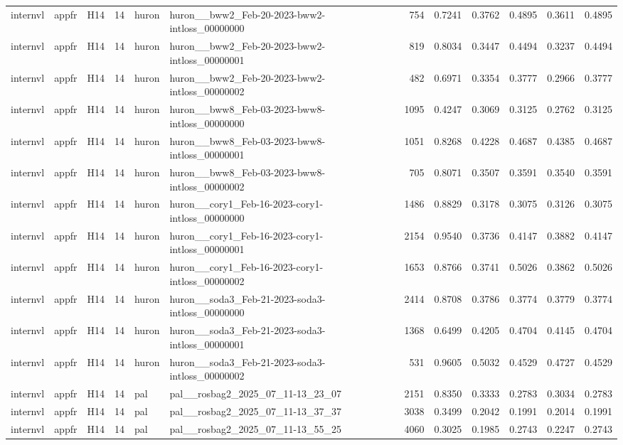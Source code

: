 \begin{table}[tbp]
\begin{tabular}{lllrllrrrrrr}
internvl & appfr & H14 & 14 & huron & huron\_\_bww2\_Feb-20-2023-bww2-intloss\_00000000 & 754 & 0.7241 & 0.3762 & 0.4895 & 0.3611 & 0.4895 \\
internvl & appfr & H14 & 14 & huron & huron\_\_bww2\_Feb-20-2023-bww2-intloss\_00000001 & 819 & 0.8034 & 0.3447 & 0.4494 & 0.3237 & 0.4494 \\
internvl & appfr & H14 & 14 & huron & huron\_\_bww2\_Feb-20-2023-bww2-intloss\_00000002 & 482 & 0.6971 & 0.3354 & 0.3777 & 0.2966 & 0.3777 \\
internvl & appfr & H14 & 14 & huron & huron\_\_bww8\_Feb-03-2023-bww8-intloss\_00000000 & 1095 & 0.4247 & 0.3069 & 0.3125 & 0.2762 & 0.3125 \\
internvl & appfr & H14 & 14 & huron & huron\_\_bww8\_Feb-03-2023-bww8-intloss\_00000001 & 1051 & 0.8268 & 0.4228 & 0.4687 & 0.4385 & 0.4687 \\
internvl & appfr & H14 & 14 & huron & huron\_\_bww8\_Feb-03-2023-bww8-intloss\_00000002 & 705 & 0.8071 & 0.3507 & 0.3591 & 0.3540 & 0.3591 \\
internvl & appfr & H14 & 14 & huron & huron\_\_cory1\_Feb-16-2023-cory1-intloss\_00000000 & 1486 & 0.8829 & 0.3178 & 0.3075 & 0.3126 & 0.3075 \\
internvl & appfr & H14 & 14 & huron & huron\_\_cory1\_Feb-16-2023-cory1-intloss\_00000001 & 2154 & 0.9540 & 0.3736 & 0.4147 & 0.3882 & 0.4147 \\
internvl & appfr & H14 & 14 & huron & huron\_\_cory1\_Feb-16-2023-cory1-intloss\_00000002 & 1653 & 0.8766 & 0.3741 & 0.5026 & 0.3862 & 0.5026 \\
internvl & appfr & H14 & 14 & huron & huron\_\_soda3\_Feb-21-2023-soda3-intloss\_00000000 & 2414 & 0.8708 & 0.3786 & 0.3774 & 0.3779 & 0.3774 \\
internvl & appfr & H14 & 14 & huron & huron\_\_soda3\_Feb-21-2023-soda3-intloss\_00000001 & 1368 & 0.6499 & 0.4205 & 0.4704 & 0.4145 & 0.4704 \\
internvl & appfr & H14 & 14 & huron & huron\_\_soda3\_Feb-21-2023-soda3-intloss\_00000002 & 531 & 0.9605 & 0.5032 & 0.4529 & 0.4727 & 0.4529 \\
internvl & appfr & H14 & 14 & pal & pal\_\_rosbag2\_2025\_07\_11-13\_23\_07 & 2151 & 0.8350 & 0.3333 & 0.2783 & 0.3034 & 0.2783 \\
internvl & appfr & H14 & 14 & pal & pal\_\_rosbag2\_2025\_07\_11-13\_37\_37 & 3038 & 0.3499 & 0.2042 & 0.1991 & 0.2014 & 0.1991 \\
internvl & appfr & H14 & 14 & pal & pal\_\_rosbag2\_2025\_07\_11-13\_55\_25 & 4060 & 0.3025 & 0.1985 & 0.2743 & 0.2247 & 0.2743 \\

\end{tabular}
\end{table}
